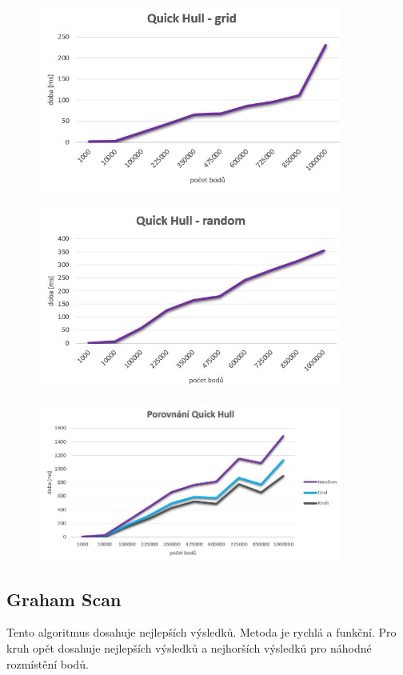 \documentclass[a4paper, 12pt]{article}
\begin{document}
\begin{figure}[h!]
	\centering
	\includegraphics[width=10cm]{quickhull_grid.jpg}
\end{figure}


\begin{figure}[h!]
	\centering
	\includegraphics[width=10cm]{quickhull_random.jpg}
\end{figure}


\begin{figure}[h!]
	\centering
	\includegraphics[width=10cm]{quickhull_vse.jpg}
\end{figure}


\subsection{Graham Scan}
Tento algoritmus dosahuje nejlepších výsledků. Metoda je rychlá a funkční. Pro kruh opět dosahuje nejlepších výsledků a nejhorších výsledků pro náhodné rozmístění bodů.
\end{document}
